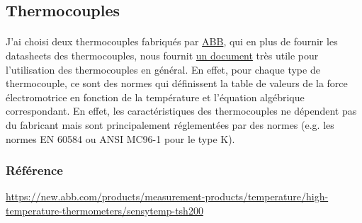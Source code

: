 \documentclass{article}
\begin{document}
        \subsection{Thermocouples}
        \paragraph{}
        J'ai choisi deux thermocouples fabriqués par \href{https://new.abb.com/}{ABB}, qui en plus de fournir les datasheets des thermocouples, nous fournit \href{https://search-ext.abb.com/library/Download.aspx?DocumentID=03%2fTEMP-EN&LanguageCode=en&DocumentPartId=&Action=Launch}{un document} très utile pour l'utilisation des thermocouples en général. En effet, pour chaque type de thermocouple, ce sont des normes qui définissent la table de valeurs de la force électromotrice en fonction de la température et l'équation algébrique correspondant. En effet, les caractéristiques des thermocouples ne dépendent pas du fabricant mais sont principalement réglementées par des normes (e.g. les normes EN 60584 ou ANSI MC96-1 pour le type K).

        \subsubsection{Référence}
        \url{https://new.abb.com/products/measurement-products/temperature/high-temperature-thermometers/sensytemp-tsh200}
\end{document}
